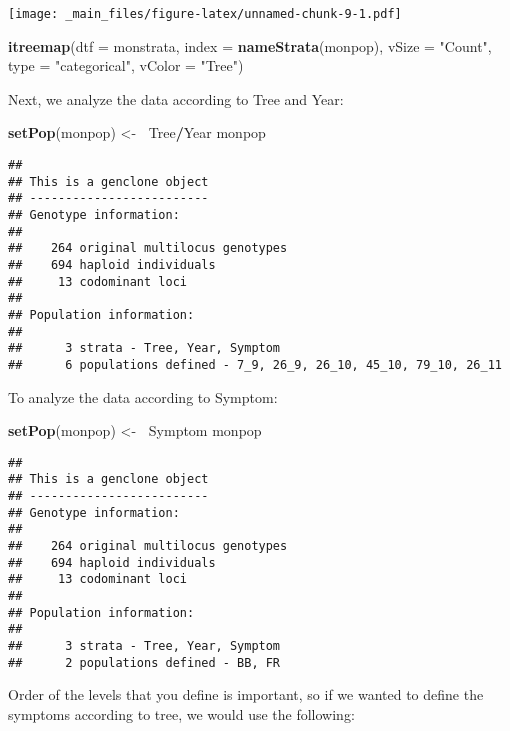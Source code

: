 \documentclass[12pt,]{krantz}
\newenvironment{Shaded}{\begin{snugshade}}{\end{snugshade}}
\newcommand{\KeywordTok}[1]{\textcolor[rgb]{0.27,0.27,0.27}{\textbf{#1}}}
\newcommand{\DataTypeTok}[1]{\textcolor[rgb]{0.27,0.27,0.27}{#1}}
\newcommand{\StringTok}[1]{\textcolor[rgb]{0.5,0.5,0.5}{#1}}
\newcommand{\OperatorTok}[1]{\textcolor[rgb]{0.81,0.36,0.00}{\textbf{#1}}}
\newcommand{\ErrorTok}[1]{\textcolor[rgb]{0.64,0.00,0.00}{\textbf{#1}}}
\newcommand{\NormalTok}[1]{#1}
\theoremstyle{definition}
\theoremstyle{definition}
\theoremstyle{definition}
\theoremstyle{remark}
\begin{document}
\texttt{[image: \_main\_files/figure-latex/unnamed-chunk-9-1.pdf]}

\begin{Shaded}
\begin{Highlighting}[]
\KeywordTok{itreemap}\NormalTok{(}\DataTypeTok{dtf =}\NormalTok{ monstrata, }\DataTypeTok{index =} \KeywordTok{nameStrata}\NormalTok{(monpop), }\DataTypeTok{vSize =} \StringTok{"Count"}\NormalTok{,}
        \DataTypeTok{type =} \StringTok{"categorical"}\NormalTok{, }\DataTypeTok{vColor =} \StringTok{"Tree"}\NormalTok{)}
\end{Highlighting}
\end{Shaded}

Next, we analyze the data according to Tree and Year:

\begin{Shaded}
\begin{Highlighting}[]
\KeywordTok{setPop}\NormalTok{(monpop) <-}\StringTok{ }\ErrorTok{~}\NormalTok{Tree}\OperatorTok{/}\NormalTok{Year}
\NormalTok{monpop}
\end{Highlighting}
\end{Shaded}

\begin{verbatim}
## 
## This is a genclone object
## -------------------------
## Genotype information:
## 
##    264 original multilocus genotypes 
##    694 haploid individuals
##     13 codominant loci
## 
## Population information:
## 
##      3 strata - Tree, Year, Symptom
##      6 populations defined - 7_9, 26_9, 26_10, 45_10, 79_10, 26_11
\end{verbatim}

To analyze the data according to Symptom:

\begin{Shaded}
\begin{Highlighting}[]
\KeywordTok{setPop}\NormalTok{(monpop) <-}\StringTok{ }\ErrorTok{~}\NormalTok{Symptom}
\NormalTok{monpop}
\end{Highlighting}
\end{Shaded}

\begin{verbatim}
## 
## This is a genclone object
## -------------------------
## Genotype information:
## 
##    264 original multilocus genotypes 
##    694 haploid individuals
##     13 codominant loci
## 
## Population information:
## 
##      3 strata - Tree, Year, Symptom
##      2 populations defined - BB, FR
\end{verbatim}

Order of the levels that you define is important, so if we wanted to
define the symptoms according to tree, we would use the following:
\end{document}
